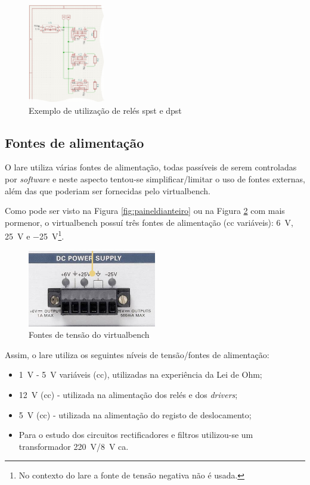 \begin{figure}[hbtp]
	\centering
	\includegraphics[width=0.3\textwidth]{figures/exemplo_reles_spst.png}
	\caption{Exemplo de utilização de relés \acrshort{spst} e \acrshort{dpst}}
	\label{fig:relespstdpst}
\end{figure}

\subsection{Fontes de alimentação}
\label{sec:fontesalimentacao}

O \acrshort{lare} utiliza várias fontes de alimentação, todas passíveis de serem controladas por \textit{software} e neste aspecto tentou-se simplificar/limitar o uso de fontes externas, além das que poderiam ser fornecidas pelo \acrshort{virtualbench}. 

Como pode ser visto na Figura \ref{fig:paineldianteiro} ou na Figura \ref{fig:promenorfontes} com mais pormenor, o \acrshort{virtualbench} possuí três fontes de alimentação (\acrshort{cc} variáveis): \SI{+6}{\volt}, \SI{+25}{\volt} e \SI{-25}{\volt}\footnote{No contexto do \acrshort{lare} a fonte de tensão negativa não é usada.}.

\begin{figure}[hbtp]
	\centering
	\includegraphics[width=0.5\textwidth]{figures/fontes_VB.png}
	\caption{Fontes de tensão do \acrshort{virtualbench}}
	\label{fig:promenorfontes}
\end{figure}

Assim, o \acrshort{lare} utiliza os seguintes níveis de tensão/fontes de alimentação:
\begin{itemize}
	\item \SI{1}{\volt} - \SI{5}{\volt} variáveis (\acrshort{cc}), utilizadas na experiência da Lei de Ohm;
	\item \SI{12}{\volt} (\acrshort{cc}) - utilizada na alimentação dos relés e dos \textit{drivers};
	\item \SI{5}{\volt} (\acrshort{cc}) - utilizada na alimentação do registo de deslocamento;
	\item Para o estudo dos circuitos rectificadores e filtros utilizou-se um transformador \SI{220}{\volt}/\SI{8}{\volt} \acrshort{ca}.
\end{itemize}

